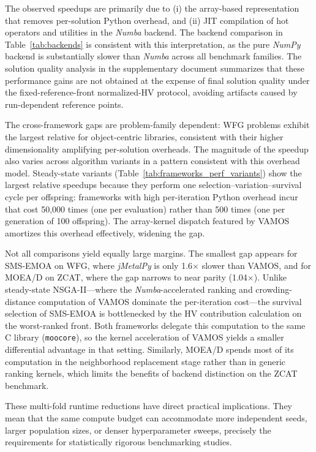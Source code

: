 \documentclass[final,5p,times,twocolumn]{elsarticle}
\newcommand{\VAMOS}{VAMOS}
\begin{document}
The observed speedups are primarily due to (i) the array-based representation that removes per-solution Python overhead, and (ii) JIT compilation of hot operators and utilities in the \textit{Numba} backend. The backend comparison in Table~\ref{tab:backends} is consistent with this interpretation, as the pure \textit{NumPy} backend is substantially slower than \textit{Numba} across all benchmark families. The solution quality analysis in the supplementary document summarizes that these performance gains are not obtained at the expense of final solution quality under the fixed-reference-front normalized-HV protocol, avoiding artifacts caused by run-dependent reference points.

The cross-framework gaps are problem-family dependent: WFG problems exhibit the largest relative  for object-centric libraries, consistent with their higher dimensionality amplifying per-solution overheads. The magnitude of the speedup also varies across algorithm variants in a pattern consistent with this overhead model. Steady-state variants (Table~\ref{tab:frameworks_perf_variants}) show the largest relative speedups because they perform one selection--variation--survival cycle per offspring: frameworks with high per-iteration Python overhead incur that cost 50{,}000 times (one per evaluation) rather than 500 times (one per generation of 100 offspring). The array-kernel dispatch featured by VAMOS amortizes this overhead effectively, widening the gap.

Not all comparisons yield equally large margins. The smallest gap appears for SMS-EMOA on WFG, where \textit{jMetalPy} is only 1.6$\times$ slower than \VAMOS{}, and for MOEA/D on ZCAT, where the gap narrows to near parity (1.04$\times$). Unlike steady-state NSGA-II---where the \textit{Numba}-accelerated ranking and crowding-distance computation of \VAMOS{} dominate the per-iteration cost---the survival selection of SMS-EMOA is bottlenecked by the HV contribution calculation on the worst-ranked front. Both frameworks delegate this computation to the same C library (\texttt{moocore}), so the kernel acceleration of \VAMOS{} yields a smaller differential advantage in that setting. Similarly, MOEA/D spends most of its computation  in the neighborhood replacement stage rather than in generic ranking kernels, which limits the benefits of backend distinction on the ZCAT benchmark.

These multi-fold runtime reductions have direct practical implications. They mean that the same compute budget can accommodate more independent seeds, larger population sizes, or denser hyperparameter sweeps, precisely the requirements for statistically rigorous benchmarking studies.
\end{document}
